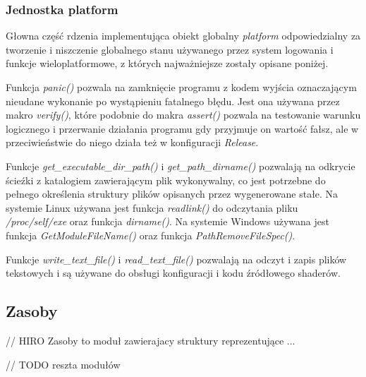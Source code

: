 \subsubsection{Jednostka platform}
Głowna część rdzenia implementująca obiekt globalny \textit{platform} odpowiedzialny za tworzenie i niszczenie globalnego stanu używanego przez system logowania i funkcje wieloplatformowe, z których najważniejsze zostały opisane poniżej.

Funkcja \textit{panic()} pozwala na zamknięcie programu z kodem wyjścia oznaczającym nieudane wykonanie po wystąpieniu fatalnego błędu.
Jest ona używana przez makro \textit{verify()}, które podobnie do makra \textit{assert()} pozwala na testowanie warunku logicznego i przerwanie działania programu gdy przyjmuje on wartość fałsz, ale w przeciwieństwie do niego działa też w konfiguracji \textit{Release}.

Funkcje \textit{get\_executable\_dir\_path()} i \textit{get\_path\_dirname()} pozwalają na odkrycie ścieźki z katalogiem zawierającym plik wykonywalny, co jest potrzebne do pełnego określenia struktury plików opisanych przez wygenerowane stałe.
Na systemie Linux używana jest funkcja \textit{readlink()} do odczytania pliku \textit{/proc/self/exe}
oraz funkcja \textit{dirname()}.
Na systemie Windows używana jest funkcja \textit{GetModuleFileName()} oraz funkcja \textit{PathRemoveFileSpec()}.

Funkcje \textit{write\_text\_file()} i \textit{read\_text\_file()} pozwalają na odczyt i zapis plików tekstowych i są używane do obsługi konfiguracji i kodu źródłowego shaderów.

\subsection{Zasoby}

// HIRO Zasoby to moduł zawierajacy struktury reprezentujące ...

// TODO reszta modułów
